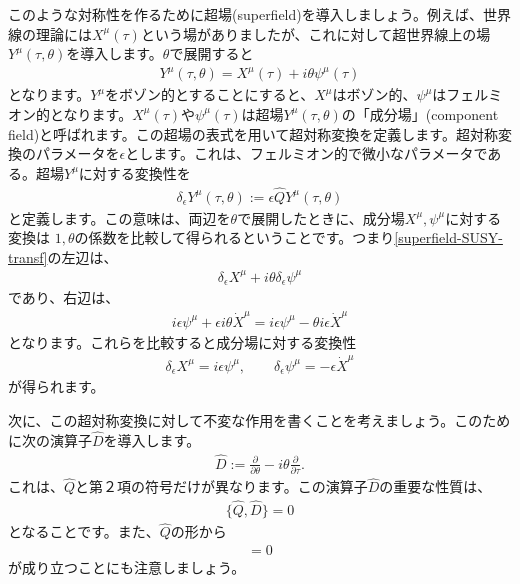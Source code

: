 \documentclass[report,paper=a4, fontsize=12pt, line_length=16cm, number_of_lines=34,dvipdfmx]{jlreq}
\numberwithin{equation}{chapter}
\numberwithin{equation}{section}
\newcommand{\del}{\partial}
\newcommand{\deldel}[2]{\frac{\del {#1}}{\del {#2}}}
\newcommand{\Qh}{\widehat{Q}}
\newcommand{\Dh}{\widehat{D}}
\begin{document}
このような対称性を作るために超場(superfield)を導入しましょう。例えば、世界線の理論には$X^{\mu}(\tau)$という場がありましたが、これに対して超世界線上の場$Y^{\mu}(\tau,\theta)$を導入します。$\theta$で展開すると
\begin{align}
Y^{\mu}(\tau,\theta)=X^{\mu}(\tau) + i\theta \psi^{\mu}(\tau)
\end{align}
となります。$Y^{\mu}$をボゾン的とすることにすると、$X^{\mu}$はボゾン的、$\psi^{\mu}$はフェルミオン的となります。$X^{\mu}(\tau)$や$\psi^{\mu}(\tau)$は超場$Y^{\mu}(\tau,\theta)$の「成分場」(component field)と呼ばれます。この超場の表式を用いて超対称変換を定義します。超対称変換のパラメータを$\epsilon$とします。これは、フェルミオン的で微小なパラメータである。超場$Y^{\mu}$に対する変換性を
\begin{align}
\delta_{\epsilon} Y^{\mu}(\tau,\theta) := \epsilon \Qh Y^{\mu}(\tau,\theta)
\label{superfield-SUSY-transf}
\end{align}
と定義します。この意味は、両辺を$\theta$で展開したときに、成分場$X^{\mu},\psi^{\mu}$に対する変換は
$1, \theta$の係数を比較して得られるということです。つまり\eqref{superfield-SUSY-transf}の左辺は、
\begin{align}
\delta_{\epsilon}X^{\mu} + i\theta \delta_{\epsilon} \psi^{\mu}
\end{align}
であり、右辺は、
\begin{align}
i\epsilon \psi^{\mu} +\epsilon i\theta \dot{X}^{\mu}
=i\epsilon \psi^{\mu} -\theta i\epsilon \dot{X}^{\mu}
\end{align}
となります。これらを比較すると成分場に対する変換性
\begin{align}
\delta_{\epsilon} X^{\mu}=i\epsilon \psi^{\mu},\qquad
\delta_{\epsilon} \psi^{\mu}=-\epsilon \dot{X}^{\mu}
\end{align}
が得られます。

次に、この超対称変換に対して不変な作用を書くことを考えましょう。このために次の演算子$\Dh$を導入します。
\begin{align}
\Dh:=\deldel{}{\theta}-i\theta\deldel{}{\tau}.
\end{align}
これは、$\Qh$と第２項の符号だけが異なります。この演算子$\Dh$の重要な性質は、
\begin{align}
\{\Qh,\Dh\}=0 \label{com-Q-D}
\end{align}
となることです。また、$\Qh$の形から
\begin{align}
[\del_{\tau},\Qh]=0\label{com-deltau-Q}
\end{align}
が成り立つことにも注意しましょう。
\end{document}
